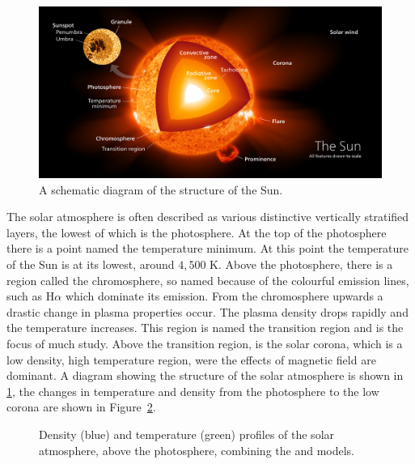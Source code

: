 \documentclass[a4paper,12pt,fourier,authoryear,custommargin]{Classes/PhDThesisPSnPDF}
\begin{document}
\begin{figure}[h]
\centering
\includegraphics[width=0.9\linewidth]{Chapter1/Figs/Sun_poster}
\caption{A schematic diagram of the structure of the Sun. \citep{kelvinsong2015}}
\label{fig:sun_poster}
\end{figure}


The solar atmosphere is often described as various distinctive vertically stratified layers, the lowest of which is the photosphere.
At the top of the photosphere there is a point named the temperature minimum.
At this point the temperature of the Sun is at its lowest, around $4,500$ K.
Above the photosphere, there is a region called the chromosphere, so named because of the colourful emission lines, such as H$\alpha$ which dominate its emission.
From the chromosphere upwards a drastic change in plasma properties occur.
The plasma density drops rapidly and the temperature increases.
This region is named the transition region and is the focus of much study.
Above the transition region, is the solar corona, which is a low density, high temperature region, were the effects of magnetic field are dominant.
A diagram showing the structure of the solar atmosphere is shown in \cref{fig:sun_poster}, the changes in temperature and density from the photosphere to the low corona are shown in Figure~\ref{fig:atmos}.



\begin{figure}[h]
    \centering
    \caption{Density (blue) and temperature (green) profiles of the solar atmosphere, above the photosphere, combining the \cite{mcwhirter1975} and \cite{vernazza1981} models.}
    \label{fig:atmos}
\end{figure}
\end{document}
